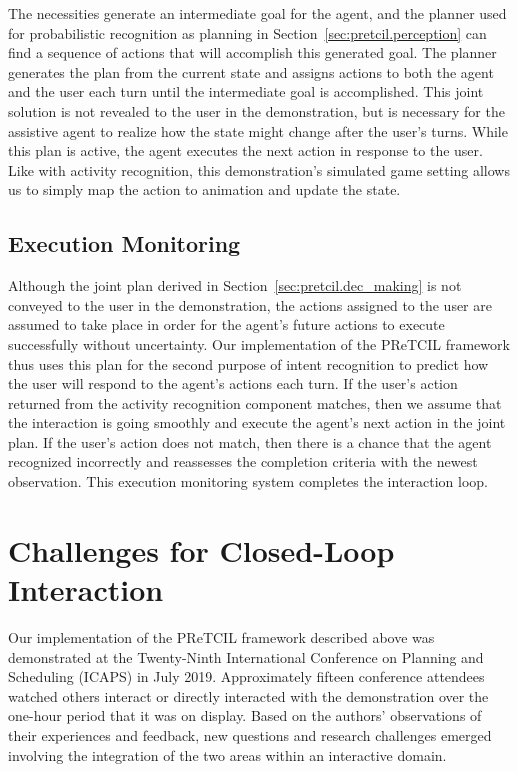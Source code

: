 \documentclass[letterpaper]{article} %
\begin{document}
The necessities generate an intermediate goal for the agent, and the planner used for probabilistic recognition as planning in Section~\ref{sec:pretcil.perception} can find a sequence of actions that will accomplish this generated goal.  The planner generates the plan from the current state and assigns actions to both the agent and the user each turn until the intermediate goal is accomplished.  This joint solution is not revealed to the user in the demonstration, but is necessary for the assistive agent to realize how the state might change after the user's turns.  While this plan is active, the agent executes the next action in response to the user.  Like with activity recognition, this demonstration's simulated game setting allows us to simply map the action to animation and update the state.

\subsection{Execution Monitoring\label{sec:pretcil.exec_monitor}}
Although the joint plan derived in Section~\ref{sec:pretcil.dec_making} is not conveyed to the user in the demonstration, the actions assigned to the user are assumed to take place in order for the agent's future actions to execute successfully without uncertainty.  Our implementation of the {\sc PReTCIL} framework thus uses this plan for the second purpose of intent recognition to predict how the user will respond to the agent's actions each turn.  If the user's action returned from the activity recognition component matches, then we assume that the interaction is going smoothly and execute the agent's next action in the joint plan.  If the user's action does not match, then there is a chance that the agent recognized incorrectly and reassesses the %
 completion criteria with the newest observation.  This execution monitoring system completes the interaction loop.%

\section{Challenges for Closed-Loop Interaction \label{sec:challenges}}
Our implementation of the {\sc PReTCIL} framework described above was demonstrated at the Twenty-Ninth International Conference on Planning and Scheduling (ICAPS) in July 2019.  Approximately fifteen conference attendees watched others interact or directly interacted with the demonstration over the one-hour period that it was on display.  Based on the authors' observations of their experiences and feedback, new questions and research challenges emerged involving the integration of the two areas within an interactive domain.
\end{document}
